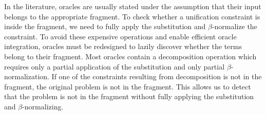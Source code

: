 In the literature, oracles are usually stated under the assumption that their
input belongs to the appropriate fragment. To check whether a unification
constraint is inside the fragment, we need to fully apply the substitution and
$\beta$-normalize the constraint.
To avoid these expensive operations and enable efficient oracle integration, 
oracles must be redesigned to lazily discover whether the terms
belong to their fragment.  
Most oracles contain a decomposition operation which requires only a partial application of
the substitution and only partial $\beta$-normalization. If one of the constraints resulting from decomposition is not in
the fragment, the original problem is not in the fragment. 
This allows us to detect that the problem is not in the fragment without fully applying
the substitution and $\beta$-normalizing.


